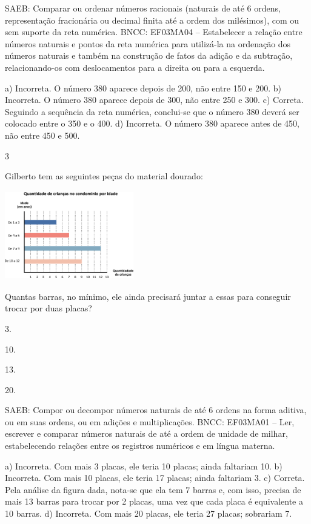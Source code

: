 \begin{multicols}{2}
{\begin{escolha}
{SAEB: Comparar ou ordenar números racionais (naturais de até 6 ordens, representação fracionária ou decimal finita até a ordem dos milésimos), com ou sem suporte da reta numérica.
BNCC: EF03MA04 -- Estabelecer a relação entre números naturais e pontos da reta numérica para
utilizá-la na ordenação dos números naturais e também na construção de fatos da adição e da
subtração, relacionando-os com deslocamentos para a direita ou para a esquerda.

a) Incorreta. O número 380 aparece depois de 200, não entre 150 e 200.
b) Incorreta. O número 380 aparece depois de 300, não entre 250 e 300.
c) Correta. Seguindo a sequência da reta numérica, conclui-se que o número 380 deverá ser colocado entre o 350 e o 400.
d) Incorreta. O número 380 aparece antes de 450, não entre 450 e 500.

\num{3}

Gilberto tem as seguintes peças do material dourado:


\includegraphics[width=2.20852in,height=1.52513in]{media/image118.png}

Quantas barras, no mínimo, ele ainda precisará juntar a essas para conseguir trocar por duas placas?

\begin{escolha}
\item
  3.
\item
  10.
\item
  13.
\item
  20.
\end{escolha}

SAEB: Compor ou decompor números naturais de até 6 ordens na forma aditiva, ou em suas ordens, ou em adições e multiplicações.
BNCC: EF03MA01 -- Ler, escrever e comparar números naturais de até a ordem de unidade de milhar, estabelecendo relações entre os registros numéricos e em língua materna.

a) Incorreta. Com mais 3 placas, ele teria 10 placas; ainda faltariam 10.
b) Incorreta. Com mais 10 placas, ele teria 17 placas; ainda faltariam 3.
c) Correta. Pela análise da figura dada, nota-se que ela tem 7 barras e, com isso,
precisa de mais 13 barras para trocar por 2 placas, uma vez que cada placa é equivalente a 10 barras.
d) Incorreta. Com mais 20 placas, ele teria 27 placas; sobrariam 7.

}
\end{escolha}}
\end{multicols}
